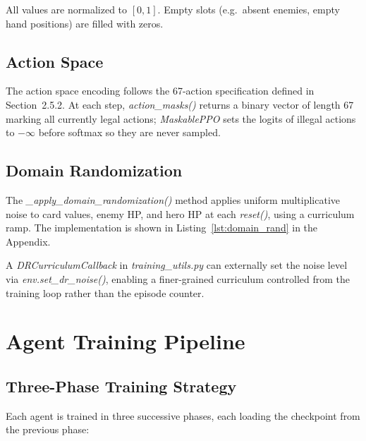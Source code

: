 All values are normalized to $[0, 1]$. Empty slots (e.g.\ absent enemies, empty hand positions) are filled with zeros.

\subsection{Action Space}

The action space encoding follows the 67-action specification defined in Section~2.5.2. At each step, \textit{action\_masks()} returns a binary vector of length 67 marking all currently legal actions; \textit{MaskablePPO} sets the logits of illegal actions to $-\infty$ before softmax so they are never sampled.

\subsection{Domain Randomization}

The \textit{\_apply\_domain\_randomization()} method applies uniform multiplicative noise to card values, enemy HP, and hero HP at each \textit{reset()}, using a curriculum ramp. The implementation is shown in Listing~\ref{lst:domain_rand} in the Appendix.

\begin{sloppypar}
A \textit{DRCurriculumCallback} in \textit{training\_utils.py} can externally set the noise level via \textit{env.set\_dr\_noise()}, enabling a finer-grained curriculum controlled from the training loop rather than the episode counter.
\end{sloppypar}

\section{Agent Training Pipeline}

\subsection{Three-Phase Training Strategy}

Each agent is trained in three successive phases, each loading the checkpoint from the previous phase:

